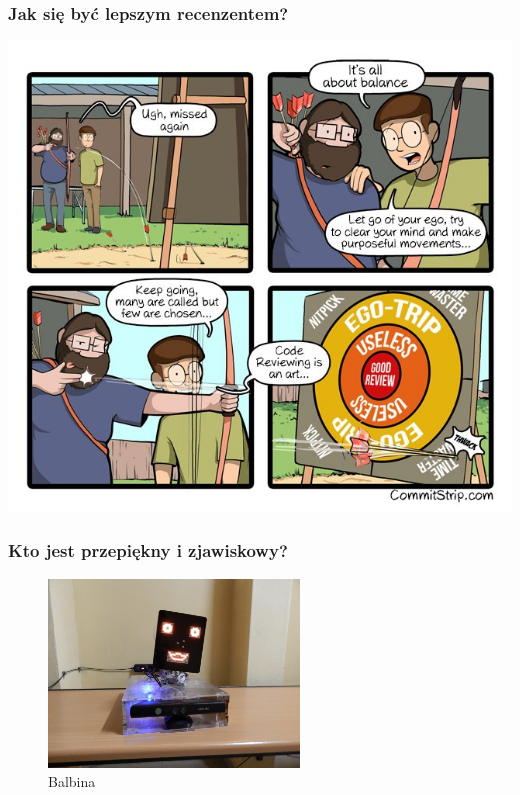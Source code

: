 \documentclass[xcolor=dvipsnames]{beamer}%
\begin{document}
\begin{frame}
	\frametitle{Jak się być lepszym recenzentem?}
	\centering \includegraphics[width=\textwidth,height=0.85\textheight,keepaspectratio]{figure/trening.jpeg}
\end{frame}

\begin{frame}
	\frametitle{Kto jest przepiękny i zjawiskowy?}
	\centering \begin{figure}
		\includegraphics[height=5cm]{figure/balbina.jpg}
		\caption{Balbina}
	\end{figure}
\end{frame}
\end{document}
